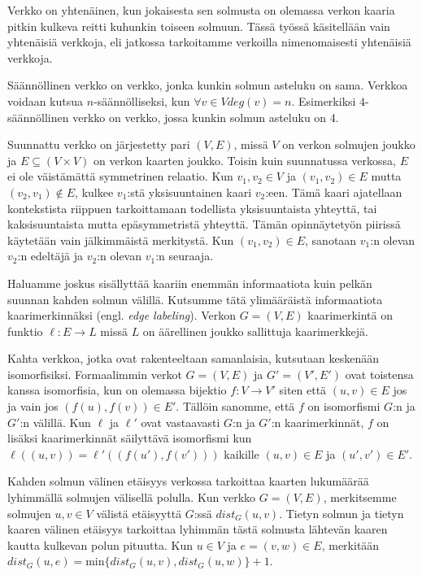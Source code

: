 \documentclass[12pt,finnish]{tktltiki2}
\theoremstyle{definition}
\theoremstyle{remark}
\begin{document}
Verkko on yhtenäinen, kun jokaisesta sen solmusta on olemassa verkon kaaria pitkin kulkeva reitti kuhunkin toiseen solmuun. Tässä työssä käsitellään vain yhtenäisiä verkkoja, eli jatkossa tarkoitamme verkoilla nimenomaisesti yhtenäisiä verkkoja.

Säännöllinen verkko on verkko, jonka kunkin solmun asteluku on sama. Verkkoa voidaan kutsua $n$-säännölliseksi, kun $\forall v \in V deg(v) = n$. Esimerkiksi $4$-säännöllinen verkko on verkko, jossa kunkin solmun asteluku on 4.

Suunnattu verkko on järjestetty pari $(V, E)$, missä $V$ on verkon solmujen joukko ja $E \subseteq (V \times V)$ on verkon kaarten joukko. Toisin kuin suunnatussa verkossa, $E$ ei ole väistämättä symmetrinen relaatio. Kun $v_1, v_2 \in V$ ja $(v_1, v_2) \in E$ mutta $(v_2, v_1) \notin E$, kulkee $v_1$:stä yksisuuntainen kaari $v_2$:een. Tämä kaari ajatellaan kontekstista riippuen tarkoittamaan todellista yksisuuntaista yhteyttä, tai kaksisuuntaista mutta epäsymmetristä yhteyttä. Tämän opinnäytetyön piirissä käytetään vain jälkimmäistä merkitystä. Kun $(v_1, v_2) \in E$, sanotaan $v_1$:n olevan $v_2$:n edeltäjä ja $v_2$:n olevan $v_1$:n seuraaja.

Haluamme joskus sisällyttää kaariin enemmän informaatiota kuin pelkän suunnan kahden solmun välillä. Kutsumme tätä ylimääräistä informaatiota kaarimerkinnäksi (engl. \textit{edge labeling}). Verkon $G = (V, E)$ kaarimerkintä on funktio $\ell: E \rightarrow L$ missä $L$ on äärellinen joukko sallittuja kaarimerkkejä.

Kahta verkkoa, jotka ovat rakenteeltaan samanlaisia, kutsutaan keskenään isomorfisiksi. Formaalimmin verkot $G = (V, E)$ ja $G' = (V', E')$ ovat toistensa kanssa isomorfisia, kun on olemassa bijektio $f: V \rightarrow V'$ siten että $(u, v) \in E$ jos ja vain jos $(f(u), f(v)) \in E'$. Tällöin sanomme, että $f$ on isomorfismi $G$:n ja $G'$:n välillä. Kun $\ell$ ja $\ell'$ ovat vastaavasti $G$:n ja $G'$:n kaarimerkinnät, $f$ on lisäksi kaarimerkinnät säilyttävä isomorfismi kun $\ell((u, v)) = \ell'((f(u'), f(v')))$ kaikille $(u, v) \in E$ ja $(u', v') \in E'$.

Kahden solmun välinen etäisyys verkossa tarkoittaa kaarten lukumäärää lyhimmällä solmujen välisellä polulla. Kun verkko $G = (V, E)$, merkitsemme solmujen $u, v \in V$ välistä etäisyyttä $G$:ssä $dist_G(u, v)$. Tietyn solmun ja tietyn kaaren välinen etäisyys tarkoittaa lyhimmän tästä solmusta lähtevän kaaren kautta kulkevan polun pituutta. Kun $u \in V$ ja $e = (v, w) \in E$, merkitään $dist_G(u, e) = \text{min}\{dist_G(u, v), dist_G(u, w)\} + 1$.
\end{document}
